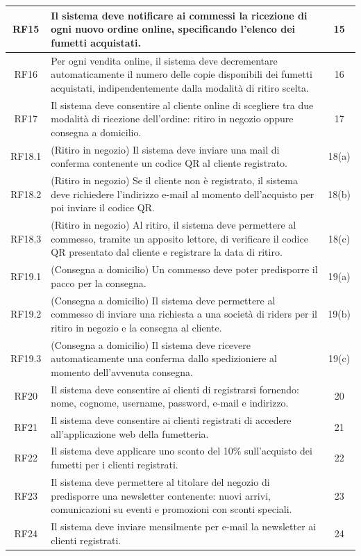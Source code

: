 \documentclass[12pt, a4paper]{article}
\begin{document}
\begin{longtable}{|c|>{\raggedright\arraybackslash}p{12cm}|c|}
\hline
RF15 & Il sistema deve notificare ai commessi la ricezione di ogni nuovo ordine online, specificando l’elenco dei fumetti acquistati. & 15 \\
\hline
RF16 & Per ogni vendita online, il sistema deve decrementare automaticamente il numero delle copie disponibili dei fumetti acquistati, indipendentemente dalla modalità di ritiro scelta. & 16 \\
\hline
RF17 & Il sistema deve consentire al cliente online di scegliere tra due modalità di ricezione dell’ordine: ritiro in negozio oppure consegna a domicilio. & 17 \\
\hline
RF18.1 & (Ritiro in negozio) Il sistema deve inviare una mail di conferma contenente un codice QR al cliente registrato. & 18(a) \\
\hline
RF18.2 & (Ritiro in negozio) Se il cliente non è registrato, il sistema deve richiedere l’indirizzo e-mail al momento dell’acquisto per poi inviare il codice QR. & 18(b) \\
\hline
RF18.3 & (Ritiro in negozio) Al ritiro, il sistema deve permettere al commesso, tramite un apposito lettore, di verificare il codice QR presentato dal cliente e registrare la data di ritiro. & 18(c) \\
\hline
RF19.1 & (Consegna a domicilio) Un commesso deve poter predisporre il pacco per la consegna. & 19(a) \\
\hline
RF19.2 & (Consegna a domicilio) Il sistema deve permettere al commesso di inviare una richiesta a una società di riders per il ritiro in negozio e la consegna al cliente. & 19(b) \\
\hline
RF19.3 & (Consegna a domicilio) Il sistema deve ricevere automaticamente una conferma dallo spedizioniere al momento dell’avvenuta consegna. & 19(c) \\
\hline
RF20 & Il sistema deve consentire ai clienti di registrarsi fornendo: nome, cognome, username, password, e-mail e indirizzo. & 20 \\
\hline
RF21 & Il sistema deve consentire ai clienti registrati di accedere all’applicazione web della fumetteria. & 21 \\
\hline
RF22 & Il sistema deve applicare uno sconto del 10\% sull’acquisto dei fumetti per i clienti registrati. & 22 \\
\hline
RF23 & Il sistema deve permettere al titolare del negozio di predisporre una newsletter contenente: nuovi arrivi, comunicazioni su eventi e promozioni con sconti speciali. & 23 \\
\hline
RF24 & Il sistema deve inviare mensilmente per e-mail la newsletter ai clienti registrati. & 24 \\
\hline

\end{longtable}
\end{document}

